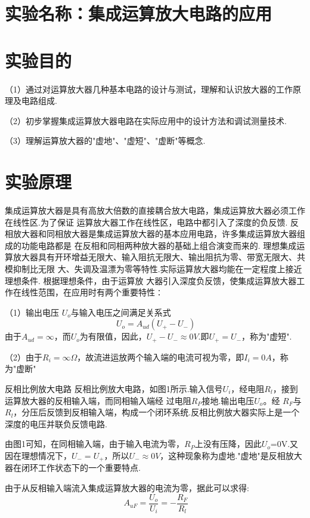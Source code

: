 \documentclass{article}
\begin{document}
	\section{ 实验名称：集成运算放大电路的应用}
    \section{ 实验目的}
     （1）通过对运算放大器几种基本电路的设计与测试，理解和认识放大器的工作原理及电路组成.\par
               （2）初步掌握集成运算放大器电路在实际应用中的设计方法和调试测量技术.\par
               （3）理解运算放大器的"虚地"、"虚短"、"虚断"等概念.
			   \section{ 实验原理}
			   集成运算放大器是具有高放大倍数的直接耦合放大电路，集成运算放大器必须工作在线性区.为了保证
			   运算放大器工作在线性区，电路中都引入了深度的负反馈.
               反相放大器和同相放大器是集成运算放大器的基本应用电路，许多集成运算放大器组成的功能电路都是
			   在反相和同相两种放大器的基础上组合演变而来的.
               理想集成运算放大器具有开环增益无限大、输入阻抗无限大、输出阻抗为零、带宽无限大、共模抑制比无限
			   大、失调及温漂为零等特性.实际运算放大器均能在一定程度上接近理想条件. 根据理想条件，由于运算放
			   大器引入深度负反馈，使集成运算放大器工作在线性范围，在应用时有两个重要特性∶\par
                （1）输出电压 $U_o$与输入电压之间满足关系式
				\begin{equation*}
					\ U_o=A_{ud}(U_+-U_-)
				\end{equation*}
              由于$A_{ud}=\infty$，而$U_o$为有限值，因此，$U_+-U_-\approx 0V$.即$U_+=U_-$，称为"虚短".\par
            （2）由于$R_i=\infty \Omega $，故流进运放两个输入端的电流可视为零，即$I_i=0A$，称为"虚断"\par
		反相比例放大电路
			反相比例放大电路，如图1所示.输入信号$U_i$，经电阻$R_l$，接到运算放大器的反相输入端，而同相输入端经
			过电阻$R_P$接地.输出电压$U_o$。经 $R_F$与 $R_l$，分压后反馈到反相输入端，构成一个闭环系统.反相比例放大器实际上是一个深度的电压并联负反馈电路.\par
			 由图1可知，在同相输入端，由于输入电流为零，$R_P$上没有压降，因此$U_o$=0V.又因在理想情况下，$U_-=U_+$，所以$U_-\approx 0V$，这种现象称为虚地."虚地"是反相放大器在闭环工作状态下的一个重要特点.\par
			由于从反相输入端流入集成运算放大器的电流为零，据此可以求得:
			\begin{equation*}
				\ A_{uF}=\frac{U_o}{U_i}=-\frac{R_F}{R_l}
			\end{equation*}
	           
\end{document}
